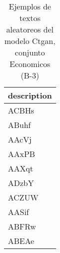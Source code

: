 \begin{table}[H]
\centering
\fontsize{8}{14}\selectfont
\caption{Ejemplos de textos aleatoreos del modelo Ctgan, conjunto Economicos (B-3)}
\label{table-sample10-economicos-b-3-ctgan-text}
\begin{tabular}{|m{50em}|}
\hline
\rowcolor[gray]{0.8}
description \\
\hline ACBHs \\
\hline ABuhf \\
\hline AAcVj \\
\hline AAxPB \\
\hline AAXqt \\
\hline ADzbY \\
\hline ACZUW \\
\hline AASif \\
\hline ABFRw \\
\hline ABEAe \\
\hline
\end{tabular}
\end{table}
